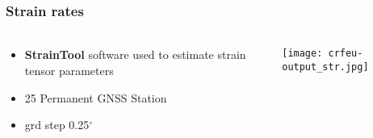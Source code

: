 
\begin{frame}
  \frametitle{Strain rates}
  \framesubtitle{}
  \label{}
  \begin{columns}[T]
    \begin{column}{.3\textwidth}
      \begin{itemize}\setlength\itemsep{.2em}
        \item \textbf{StrainTool} software used to estimate strain tensor parameters \citep{straintool}
        \item 25 Permanent GNSS Station
        \item grd step 0.25$^{\circ}$
      \end{itemize}
    \end{column}
    \begin{column}{.7\textwidth}
      \begin{center}
      \vskip-1cm
        \texttt{[image: crfeu-output\_str.jpg]}
      \end{center}
    \end{column}
  \end{columns}



\end{frame}
\note{}

